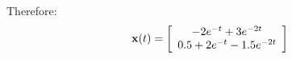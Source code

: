 Therefore:
\[
{\bf{x}}(t) = \left[ {\begin{array}{*{20}c}
   { - 2e^{ - t}  + 3e^{ - 2t} }  \\
   {0.5 + 2e^{ - t}  - 1.5e^{ - 2t} }  \\
\end{array}} \right]
\]




